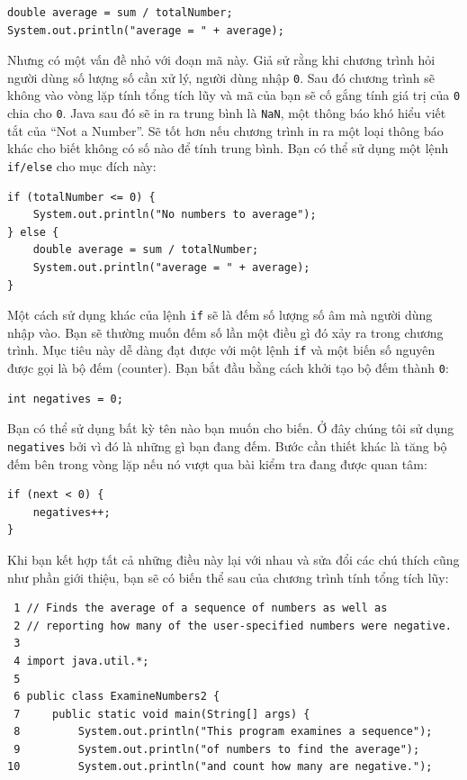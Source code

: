\begin{verbatim}
double average = sum / totalNumber;
System.out.println("average = " + average);
\end{verbatim}

Nhưng có một vấn đề nhỏ với đoạn mã này. Giả sử rằng khi chương trình
hỏi người dùng số lượng số cần xử lý, người dùng nhập \texttt{0}. Sau đó
chương trình sẽ không vào vòng lặp tính tổng tích lũy và mã của bạn sẽ
cố gắng tính giá trị của \texttt{0} chia cho \texttt{0}. Java sau đó sẽ
in ra trung bình là \texttt{NaN}, một thông báo khó hiểu viết tắt của
``Not a Number''. Sẽ tốt hơn nếu chương trình in ra một loại thông báo
khác cho biết không có số nào để tính trung bình. Bạn có thể sử dụng một
lệnh \texttt{if/else} cho mục đích này:

\begin{verbatim}
if (totalNumber <= 0) {
    System.out.println("No numbers to average");
} else {
    double average = sum / totalNumber;
    System.out.println("average = " + average);
}
\end{verbatim}

Một cách sử dụng khác của lệnh \texttt{if} sẽ là đếm số lượng số âm mà
người dùng nhập vào. Bạn sẽ thường muốn đếm số lần một điều gì đó xảy ra
trong chương trình. Mục tiêu này dễ dàng đạt được với một lệnh
\texttt{if} và một biến số nguyên được gọi là bộ đếm (counter). Bạn bắt
đầu bằng cách khởi tạo bộ đếm thành \texttt{0}:

\begin{verbatim}
int negatives = 0;
\end{verbatim}

Bạn có thể sử dụng bất kỳ tên nào bạn muốn cho biến. Ở đây chúng tôi sử
dụng \texttt{negatives} bởi vì đó là những gì bạn đang đếm. Bước cần
thiết khác là tăng bộ đếm bên trong vòng lặp nếu nó vượt qua bài kiểm
tra đang được quan tâm:

\begin{verbatim}
if (next < 0) {
    negatives++;
}
\end{verbatim}

Khi bạn kết hợp tất cả những điều này lại với nhau và sửa đổi các chú
thích cũng như phần giới thiệu, bạn sẽ có biến thể sau của chương trình
tính tổng tích lũy:

\begin{verbatim}
 1 // Finds the average of a sequence of numbers as well as
 2 // reporting how many of the user-specified numbers were negative.
 3
 4 import java.util.*;
 5
 6 public class ExamineNumbers2 {
 7     public static void main(String[] args) {
 8         System.out.println("This program examines a sequence");
 9         System.out.println("of numbers to find the average");
10         System.out.println("and count how many are negative.");
\end{verbatim}

